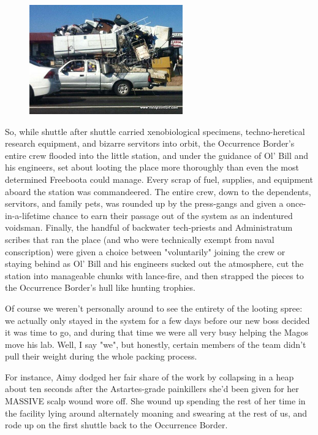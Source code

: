 \begin{figure}
	\begin{center}
		\includegraphics[width=\figwidth]{pics/17/11.png}
	\end{center}
\end{figure}
So, while shuttle after shuttle carried xenobiological specimens, techno-heretical research equipment, and bizarre servitors into orbit, the Occurrence Border's entire crew flooded into the little station, and under the guidance of Ol' Bill and his engineers, set about looting the place more thoroughly than even the most determined Freeboota could manage. 
Every scrap of fuel, supplies, and equipment aboard the station was commandeered. 
The entire crew, down to the dependents, servitors, and family pets, was rounded up by the press-gangs and given a once-in-a-lifetime chance to earn their passage out of the system as an indentured voidsman. 
Finally, the handful of backwater tech-priests and Administratum scribes that ran the place (and who were technically exempt from naval conscription) were given a choice between "voluntarily" joining the crew or staying behind as Ol' Bill and his engineers sucked out the atmosphere, cut the station into manageable chunks with lance-fire, and then strapped the pieces to the Occurrence Border's hull like hunting trophies. 


Of course we weren't personally around to see the entirety of the looting spree: 
we actually only stayed in the system for a few days before our new boss decided it was time to go, and during that time we were all very busy helping the Magos move his lab. 
Well, I say "we", but honestly, certain members of the team didn't pull their weight during the whole packing process.

For instance, Aimy dodged her fair share of the work by collapsing in a heap about ten seconds after the Astartes-grade painkillers she'd been given for her MASSIVE scalp wound wore off. 
She wound up spending the rest of her time in the facility lying around alternately moaning and swearing at the rest of us, and rode up on the first shuttle back to the Occurrence Border.

